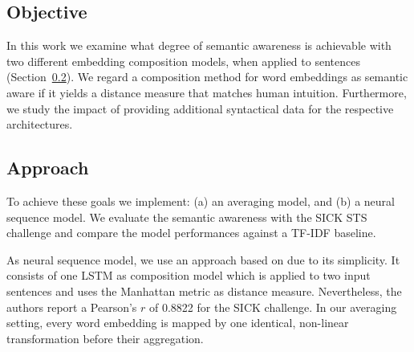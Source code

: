 
\subsection{Objective}
In this work we examine what degree of semantic awareness  is achievable with two different embedding composition models, when applied to sentences (Section~\ref{sec:approach}).
We regard a composition method for word embeddings as semantic aware if it yields a distance measure that matches human intuition. Furthermore, we study the impact of providing additional syntactical data for the respective architectures.

\subsection{Approach}
\label{sec:approach}
To achieve these goals we implement: (a) an averaging model, and (b) a neural sequence model. We evaluate the semantic awareness with the SICK \ac{STS} challenge \autocite{marelli_sick_2014} and compare the model performances against a \acs{TF-IDF} baseline.



As neural sequence model, we use an approach based on \Textcite{mueller_siamese_2016} due to its simplicity. It consists of one LSTM as composition model which is applied to two input sentences and uses the Manhattan metric as distance measure. Nevertheless, the authors report a Pearson's $r$ of 0.8822 for the SICK challenge. In our averaging setting, every word embedding is mapped by one identical, non-linear transformation before their aggregation. 


